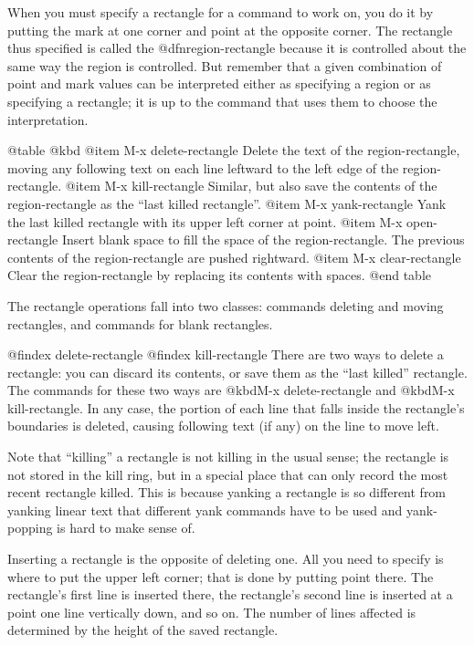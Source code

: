 {{{{{{{  When you must specify a rectangle for a command to work on, you do
it by putting the mark at one corner and point at the opposite corner.
The rectangle thus specified is called the @dfn{region-rectangle}
because it is controlled about the same way the region is controlled.
But remember that a given combination of point and mark values can be
interpreted either as specifying a region or as specifying a
rectangle; it is up to the command that uses them to choose the
interpretation.

@table @kbd
@item M-x delete-rectangle
Delete the text of the region-rectangle, moving any following text on
each line leftward to the left edge of the region-rectangle.
@item M-x kill-rectangle
Similar, but also save the contents of the region-rectangle as the
``last killed rectangle''.
@item M-x yank-rectangle
Yank the last killed rectangle with its upper left corner at point.
@item M-x open-rectangle
Insert blank space to fill the space of the region-rectangle.
The previous contents of the region-rectangle are pushed rightward.
@item M-x clear-rectangle
Clear the region-rectangle by replacing its contents with spaces.
@end table

  The rectangle operations fall into two classes: commands deleting and
moving rectangles, and commands for blank rectangles.

@findex delete-rectangle
@findex kill-rectangle
  There are two ways to delete a rectangle: you can discard its contents,
or save them as the ``last killed'' rectangle.  The commands for these
two ways are @kbd{M-x delete-rectangle} and @kbd{M-x kill-rectangle}.  In
any case, the portion of each line that falls inside the rectangle's
boundaries is deleted, causing following text (if any) on the line to move
left.

  Note that ``killing'' a rectangle is not killing in the usual sense; the
rectangle is not stored in the kill ring, but in a special place that
can only record the most recent rectangle killed.  This is because yanking
a rectangle is so different from yanking linear text that different yank
commands have to be used and yank-popping is hard to make sense of.

  Inserting a rectangle is the opposite of deleting one.  All you need to
specify is where to put the upper left corner; that is done by putting
point there.  The rectangle's first line is inserted there, the rectangle's
second line is inserted at a point one line vertically down, and so on.
The number of lines affected is determined by the height of the saved
rectangle.

}}}}}}}
